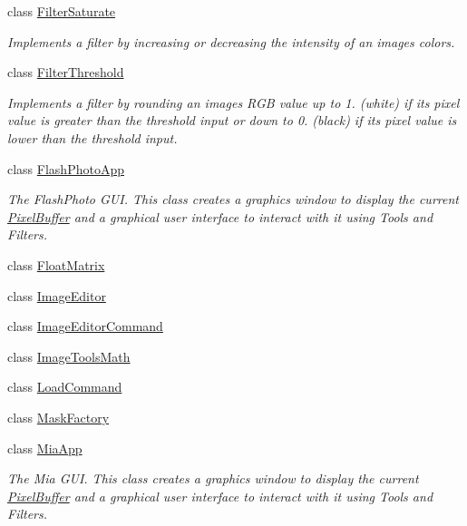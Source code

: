 \begin{DoxyCompactItemize}
class \hyperlink{classimage__tools_1_1FilterSaturate}{Filter\+Saturate}
\begin{DoxyCompactList}\small\item\em Implements a filter by increasing or decreasing the intensity of an image\textquotesingle{}s colors. \end{DoxyCompactList}\item 
class \hyperlink{classimage__tools_1_1FilterThreshold}{Filter\+Threshold}
\begin{DoxyCompactList}\small\item\em Implements a filter by rounding an image\textquotesingle{}s R\+GB value up to 1. (white) if it\textquotesingle{}s pixel value is greater than the threshold input or down to 0. (black) if it\textquotesingle{}s pixel value is lower than the threshold input. \end{DoxyCompactList}\item 
class \hyperlink{classimage__tools_1_1FlashPhotoApp}{Flash\+Photo\+App}
\begin{DoxyCompactList}\small\item\em The Flash\+Photo G\+UI. This class creates a graphics window to display the current \hyperlink{classimage__tools_1_1PixelBuffer}{Pixel\+Buffer} and a graphical user interface to interact with it using Tools and Filters. \end{DoxyCompactList}\item 
class \hyperlink{classimage__tools_1_1FloatMatrix}{Float\+Matrix}
\item 
class \hyperlink{classimage__tools_1_1ImageEditor}{Image\+Editor}
\item 
class \hyperlink{classimage__tools_1_1ImageEditorCommand}{Image\+Editor\+Command}
\item 
class \hyperlink{classimage__tools_1_1ImageToolsMath}{Image\+Tools\+Math}
\item 
class \hyperlink{classimage__tools_1_1LoadCommand}{Load\+Command}
\item 
class \hyperlink{classimage__tools_1_1MaskFactory}{Mask\+Factory}
\item 
class \hyperlink{classimage__tools_1_1MiaApp}{Mia\+App}
\begin{DoxyCompactList}\small\item\em The Mia G\+UI. This class creates a graphics window to display the current \hyperlink{classimage__tools_1_1PixelBuffer}{Pixel\+Buffer} and a graphical user interface to interact with it using Tools and Filters. \end{DoxyCompactList}\item 

\end{DoxyCompactItemize}
